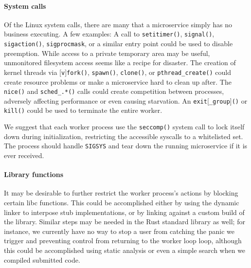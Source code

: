 \paragraph{System calls}
Of the Linux system calls, there are many that a microservice simply has no business
executing.  A few examples:  A call to \texttt{setitimer()}, \texttt{signal()},
\texttt{sigaction()}, \texttt{sigprocmask}, or a similar entry point could be used to
disable preemption.  While access to a private temporary area may be useful,
unmonitored filesystem access seems like a recipe for disaster.  The creation of
kernel threads via [\texttt{v}]\texttt{fork()}, \texttt{spawn()}, \texttt{clone()},
or \texttt{pthread\_create()} could create resource problems or make a microservice
hard to clean up after.  The \texttt{nice()} and \texttt{sched\_.*()} calls could
create competition between processes, adversely affecting performance or even causing
starvation.  An \texttt{exit}[\texttt{\_group}]\texttt{()} or \texttt{kill()} could
be used to terminate the entire worker.

We suggest that each worker process use the \texttt{seccomp()} system call to lock
itself down during initialization, restricting the accessible syscalls to a
whitelisted set.  The process should handle \texttt{SIGSYS} and tear down the running
microservice if it is ever received.

\paragraph{Library functions}
It may be desirable to further restrict the worker process's actions by blocking
certain libc functions.  This could be accomplished either by using the dynamic
linker to interpose stub implementations, or by linking against a custom build of the
library.  Similar steps may be needed in the Rust standard library as well; for
instance, we currently have no way to stop a user from catching the panic we trigger
and preventing control from returning to the worker loop loop, although this could be
accomplished using static analysis or even a simple search when we compiled submitted
code.

